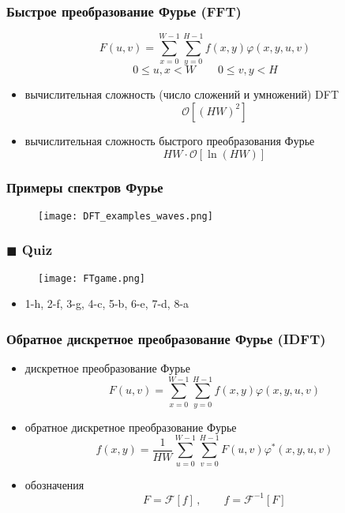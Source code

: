 \documentclass[
    12pt, 
    usepdftitle=false,
    aspectratio=1610
]{beamer}
\begin{document}
\begin{frame}
\frametitle{Быстрое преобразование Фурье (FFT)}
$$
    F(u, v)=\sum_{x=0}^{W-1}\sum_{y=0}^{H-1}f(x,y)\varphi(x,y,u,v)
$$    
$$
    0\leqslant u,x < W\qquad 
    0\leqslant v,y < H
$$
\begin{itemize}
    \item вычислительная сложность (число сложений и умножений) DFT
    $$
        \mathcal{O}[(HW)^2]
    $$ 
    \item вычислительная сложность быстрого преобразования Фурье
    $$
        HW\cdot \mathcal{O}[\ln(HW)]
    $$
\end{itemize}
\end{frame}

\begin{frame}
    \frametitle{Примеры спектров Фурье}
    \begin{figure}
        \centering
        \texttt{[image: DFT\_examples\_waves.png]}
    \end{figure}
\end{frame}

\begin{frame}
    \frametitle{$\blacksquare$ Quiz}
    \begin{figure}
        \centering
        \texttt{[image: FTgame.png]}
    \end{figure}
    \begin{itemize}
        \item<2-> 1-h, 2-f, 3-g, 4-c, 5-b, 6-e, 7-d, 8-a
    \end{itemize}
\end{frame}

\begin{frame}
\frametitle{Обратное дискретное преобразование Фурье (IDFT)}
\begin{itemize}
    \item дискретное преобразование Фурье
    $$
        F(u, v)=\sum_{x=0}^{W-1}\sum_{y=0}^{H-1}f(x,y)\varphi(x,y,u,v)
    $$  
    \item обратное дискретное преобразование Фурье
    $$
        f(x,y)=\frac{1}{HW}
        \sum_{u=0}^{W-1}\sum_{v=0}^{H-1}F(u,v)\varphi^\ast(x,y,u,v)
    $$
    \item обозначения
    $$
        F = \mathcal{F}[f]\,,\qquad
        f = \mathcal{F}^{-1}[F]
    $$
\end{itemize}
\end{frame}
\end{document}
